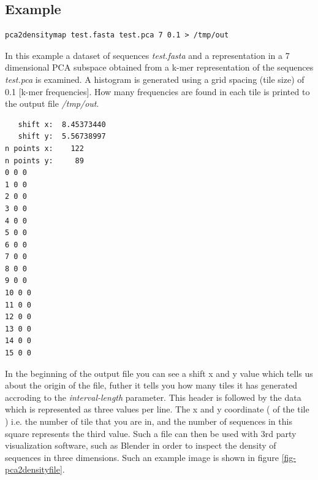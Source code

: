 \subsection{Example}
\begin{lstlisting}
pca2densitymap test.fasta test.pca 7 0.1 > /tmp/out
\end{lstlisting}
In this example a dataset of sequences \emph{test.fasta} and a
representation in a 7 dimensional PCA subspace obtained from a k-mer
representation of the sequences \emph{test.pca} is examined. A
histogram is generated using a grid spacing (tile size) of 0.1
[k-mer frequencies]. How many frequencies are found in each tile is
printed to the output file \emph{/tmp/out}.
\begin{lstlisting}
   shift x:  8.45373440
   shift y:  5.56738997
n points x:    122
n points y:     89
0 0 0
1 0 0
2 0 0
3 0 0
4 0 0
5 0 0
6 0 0
7 0 0
8 0 0
9 0 0
10 0 0
11 0 0
12 0 0
13 0 0
14 0 0
15 0 0
\end{lstlisting}
In the beginning of the output file you can see a shift x and y value
which tells us about the origin of the file, futher it tells you how many
tiles it has generated accroding to the \emph{interval-length}
parameter. This header is followed by the data which is represented as
three values per line. The x and y coordinate ( of the tile ) i.e. the
number of tile that you are in, and the number of sequences in this
square represents the third value. Such a file can then be used with
3rd party visualization software, such as Blender \cite{blender} in
order to inspect the density of sequences in three dimensions. Such an
example image is shown in figure \ref{fig-pca2densityfile}.
